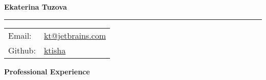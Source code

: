 \documentclass[letterpaper,11pt,oneside]{article}
\begin{document}
\noindent  \LARGE{\textbf{Ekaterina Tuzova}}  \\
\vspace{-2ex}
{\color{gray}\hrule}

\vspace{2ex}
\normalsize

\noindent \begin{tabular}{@{} l l}
Email:        &  \href{mailto:kt@jetbrains.com }{kt@jetbrains.com }\\
Github:       &  \href{https://github.com/ktisha}{ktisha } \\

\end{tabular}

\vspace{1em}

\noindent \textbf{Professional Experience}

\vspace{1em}
\end{document}
